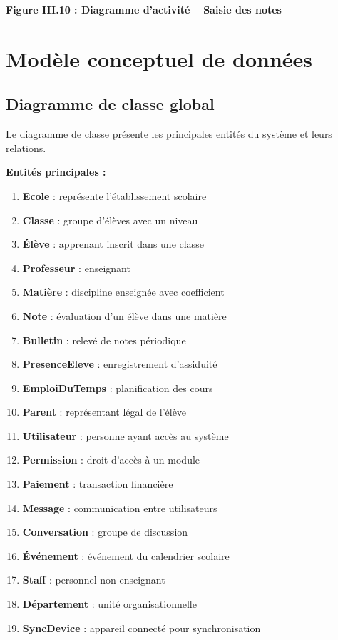 \documentclass[12pt,a4paper,twoside]{report}
\begin{document}
\begin{center}
\textbf{Figure III.10 : Diagramme d'activité -- Saisie des notes}
\end{center}

\section{Modèle conceptuel de données}

\subsection{Diagramme de classe global}

Le diagramme de classe présente les principales entités du système et leurs relations.

\textbf{Entités principales :}
\begin{enumerate}
    \item \textbf{Ecole} : représente l'établissement scolaire
    \item \textbf{Classe} : groupe d'élèves avec un niveau
    \item \textbf{Élève} : apprenant inscrit dans une classe
    \item \textbf{Professeur} : enseignant
    \item \textbf{Matière} : discipline enseignée avec coefficient
    \item \textbf{Note} : évaluation d'un élève dans une matière
    \item \textbf{Bulletin} : relevé de notes périodique
    \item \textbf{PresenceEleve} : enregistrement d'assiduité
    \item \textbf{EmploiDuTemps} : planification des cours
    \item \textbf{Parent} : représentant légal de l'élève
    \item \textbf{Utilisateur} : personne ayant accès au système
    \item \textbf{Permission} : droit d'accès à un module
    \item \textbf{Paiement} : transaction financière
    \item \textbf{Message} : communication entre utilisateurs
    \item \textbf{Conversation} : groupe de discussion
    \item \textbf{Événement} : événement du calendrier scolaire
    \item \textbf{Staff} : personnel non enseignant
    \item \textbf{Département} : unité organisationnelle
    \item \textbf{SyncDevice} : appareil connecté pour synchronisation
\end{enumerate}
\end{document}
